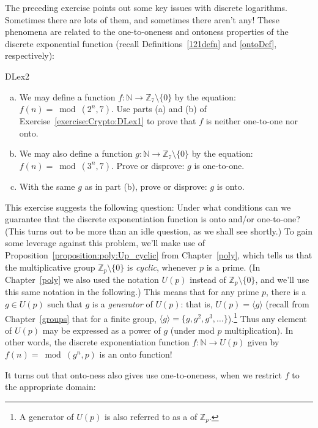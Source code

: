 The preceding exercise points out some key issues with discrete logarithms. Sometimes there are lots of them, and sometimes there aren't any! These phenomena are related to the one-to-oneness and ontoness properties of  the discrete exponential function (recall Definitions~\ref{121defn} and \ref{ontoDef}, respectively):

\begin{exercise}{DLex2}
\begin{enumerate}[(a)]
\item
We may define a function $f: \mathbb{N} \rightarrow \mathbb{Z}_7 \setminus \{0\}$ by the equation: $f(n) = \bmod(2^n,7)$. 
Use parts (a) and (b) of Exercise~\ref{exercise:Crypto:DLex1} to prove that $f$ is neither one-to-one nor onto.
\item
We may also define a function $g: \mathbb{N} \rightarrow \mathbb{Z}_7 \setminus \{0\}$ by the equation: $f(n) = \bmod(3^n,7)$. 
Prove or disprove: $g$ is one-to-one.
\item
With the same $g$ as in part (b), prove or disprove: $g$ is onto.
\end{enumerate}
\end{exercise}

This exercise suggests the following question:  Under what conditions can we guarantee that the discrete exponentiation function is onto and/or one-to-one? (This turns out to be more than an idle question, as we shall see shortly.)  To gain some leverage against this problem, we'll make use of   Proposition~\ref{proposition:poly:Up_cyclic} from Chapter~\ref{poly}, which tells us that the multiplicative group $\mathbb{Z}_p\setminus \{0\}$ is \emph{cyclic}, whenever $p$ is a prime. (In Chapter~\ref{poly} we also used the notation $U(p)$ instead of $\mathbb{Z}_p\setminus \{0\}$, and we'll use this same notation in the following.) This means that for any prime $p$, there is a $g \in U(p)$  such that $g$ is a \emph{generator} of  $U(p)$: that is, $U(p) = \langle g \rangle$ (recall from Chapter~\ref{groups} that for a finite group, $\langle g \rangle = \{g, g^2, g^3, \ldots \}$).\footnote{A generator of $U(p)$ is also referred to as a  of $\mathbb{Z}_p$.} 
Thus any element of $U(p)$ may be expressed as a power of $g$ (under mod $p$ multiplication).  In other words, the discrete exponentiation function $f: \mathbb{N} \rightarrow U(p)$ given by $f(n) = \bmod(g^n,p)$ is an onto function!  

It turns out that onto-ness also gives use one-to-oneness, when we restrict $f$ to the appropriate domain:

